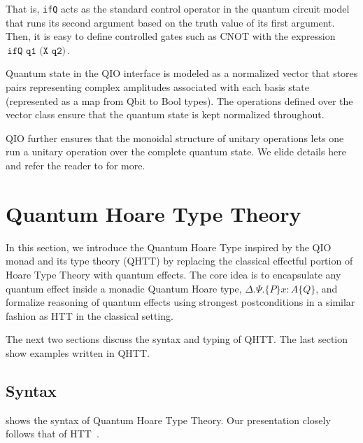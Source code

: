 \documentclass[acmsmall,nonacm,timestamp,review=false,anonymous=false]{acmart}
\newcommand{\kw}[1]{\,\mathrm{\texttt{#1}}\,}
\begin{document}
That is, \texttt{ifQ} acts as the standard control operator in the quantum circuit model that runs its second argument based on the truth value of its first argument. Then, it is easy to define controlled gates such as CNOT with the expression $\kw{ifQ q1 (X q2)}$.

Quantum state in the QIO interface is modeled as a normalized vector that stores pairs representing complex amplitudes associated with each basis state (represented as a map from Qbit to Bool types). The operations defined over the vector class ensure that the quantum state is kept normalized throughout.

QIO further ensures that the monoidal structure of unitary operations lets one run a unitary operation over the complete quantum state. We elide details here and refer the reader to \cite{qio} for more.

%

\section{Quantum Hoare Type Theory}
\label{sec:qhtt}
In this section, we introduce the Quantum Hoare Type inspired by the QIO monad and its type theory (QHTT) by replacing the classical effectful portion of Hoare Type Theory with quantum effects. The core idea is to encapsulate any quantum effect inside a monadic Quantum Hoare type, $\Delta. \Psi .\{P\} x{ : }A \{Q\}$, and formalize reasoning of quantum effects using strongest postconditions in a similar fashion as HTT in the classical setting.

The next two sections discuss the syntax and typing of QHTT. The last section show examples written in QHTT.

\subsection{Syntax}
\label{sec:syntax}

 shows the syntax of Quantum Hoare Type Theory. Our presentation closely follows that of HTT~\cite{nanevski_hoare_2008}.
\end{document}
